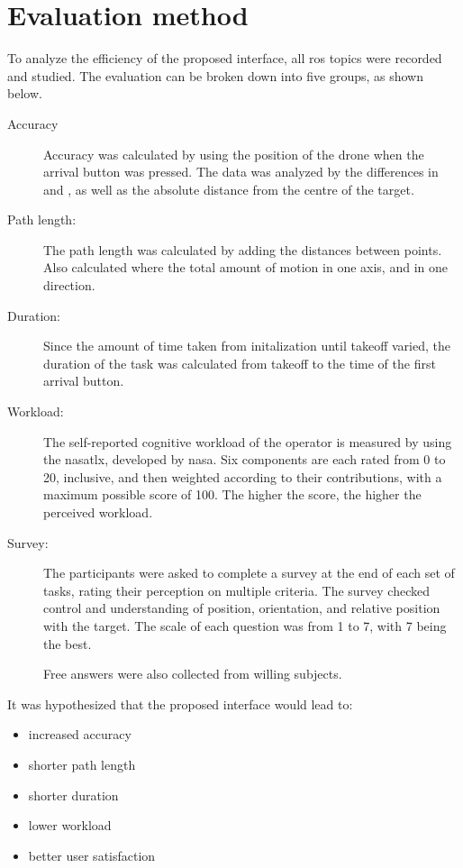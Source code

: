 \section{Evaluation method}
  \label{sec:experiment_eval}
  To analyze the efficiency of the proposed interface, all \gls{ros} topics were recorded and studied.
  The evaluation can be broken down into five groups, as shown below.

  \begin{description}
    \item[Accuracy]
      Accuracy was calculated by using the position of the drone when the arrival button was pressed.
      The data was analyzed by the differences in  and , as well as the absolute distance from the centre of the target.
    \item[Path length:]
      The path length was calculated by adding the distances between points. Also calculated where the total amount of motion in one axis, and in one direction.
    \item[Duration:]
      Since the amount of time taken from initalization until takeoff varied, the duration of the task was calculated from takeoff to the time of the first arrival button.
    \item[Workload:]
      The self-reported cognitive workload of the operator is measured by using the \gls{nasatlx}, developed by \gls{nasa}.
      Six components are each rated from 0 to 20, inclusive, and then weighted according to their contributions, with a maximum possible score of 100.
      The higher the score, the higher the perceived workload.
    \item[Survey:]
      The participants were asked to complete a survey at the end of each set of tasks, rating their perception on multiple criteria.
      The survey checked control and understanding of position, orientation, and relative position with the target.
      The scale of each question was from 1 to 7, with 7 being the best.

      Free answers were also collected from willing subjects.
  \end{description}

  It was hypothesized that the proposed interface would lead to:

  \begin{itemize}
    \item increased accuracy
    \item shorter path length
    \item shorter duration
    \item lower workload
    \item better user satisfaction
  \end{itemize}
  
